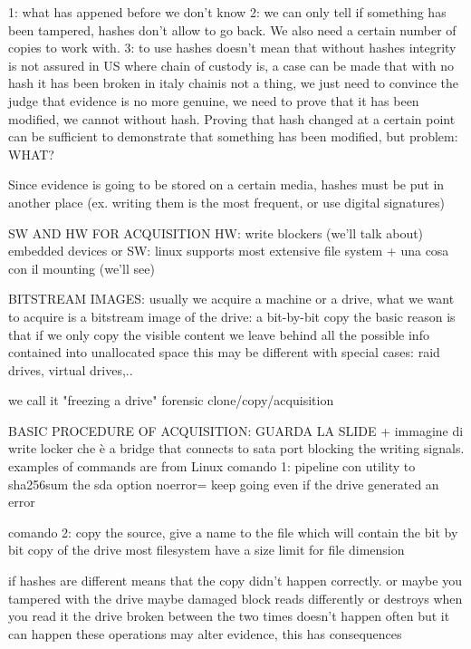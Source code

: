     1: what has appened before we don't know 
    2: we can only tell if something has been tampered, hashes don't allow to go back. We also need a certain number of copies to work with.
    3: to use hashes doesn't mean that without hashes integrity is not assured
        in US where chain of custody is, a case can be made that with no hash it has been broken 
        in italy chainis not a thing, we just need to convince the judge that evidence is no more genuine, we need to prove that it has been modified, we cannot without hash. Proving that hash changed at a certain point can be sufficient to demonstrate that something has been modified, but problem: WHAT?
    
    Since evidence is going to be stored on a certain media, hashes must be put in another place (ex. writing them is the most frequent, or use digital signatures)

SW AND HW FOR ACQUISITION
    HW: write blockers (we'll talk about)
        embedded devices 
        or
        SW: linux supports most extensive file system + una cosa con il mounting (we'll see)

BITSTREAM IMAGES:
    usually we acquire a machine or a drive, what we want to acquire is a bitstream image of the drive: a bit-by-bit copy 
    the basic reason is that if we only copy the visible content we leave behind all the possible info contained into unallocated space 
    this may be different with special cases: raid drives, virtual drives,..  

    we call it "freezing a drive"
    forensic clone/copy/acquisition 

BASIC PROCEDURE OF ACQUISITION:
    GUARDA LA SLIDE 
    + immagine di write locker che è a bridge that connects to sata port blocking the writing signals.
    examples of commands are from Linux 
    comando 1: pipeline con utility to sha256sum the sda 
        option noerror= keep going even if the drive generated an error 

    comando 2: copy the source, give a name to the file which will contain the bit by bit copy of the drive 
    most filesystem have a size limit for file dimension

    if hashes are different means that the copy didn't happen correctly.
    or maybe you tampered with the drive 
    maybe damaged block reads differently or destroys when you read it 
    the drive broken between the two times 
    doesn't happen often but it can happen 
    these operations may alter evidence, this has consequences 

